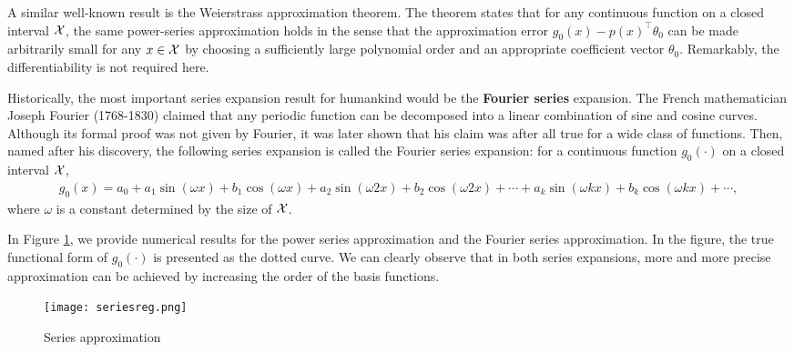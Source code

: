\documentclass[11pt, A4paper, openany, uplatex]{book}
\begin{document}
A similar well-known result is the Weierstrass approximation theorem.
The theorem states that for any continuous function on a closed interval $\mathcal{X}$, the same power-series approximation holds in the sense that the approximation error $g_0(x) - p(x)^\top \theta_0$ can be made arbitrarily small for any $x \in \mathcal{X}$ by choosing a sufficiently large polynomial order and an appropriate coefficient vector $\theta_0$. 
Remarkably, the differentiability is not required here.

Historically, the most important series expansion result for humankind would be the \textbf{Fourier series} expansion.
The French mathematician Joseph Fourier (1768-1830) claimed that any periodic function can be decomposed into a linear combination of sine and cosine curves.
Although its formal proof was not given by Fourier, it was later shown that his claim was after all true for a wide class of functions.
Then, named after his discovery, the following series expansion is called the Fourier series expansion: for a continuous function $g_0(\cdot)$ on a closed interval $\mathcal{X}$,
\begin{align*}
	g_0(x) = a_0 + a_1\sin(\omega x) + b_1\cos(\omega x) + a_2\sin(\omega 2 x) + b_2\cos(\omega 2 x) + \cdots + a_k\sin(\omega k x) + b_k\cos(\omega k x) + \cdots,
\end{align*}
where $\omega$ is a constant determined by the size of $\mathcal{X}$.

In Figure \ref{fig:seriesreg}, we provide numerical results for the power series approximation and the Fourier series approximation.
In the figure, the true functional form of $g_0(\cdot)$ is presented as the dotted curve.
We can clearly observe that in both series expansions, more and more precise approximation can be achieved by increasing the order of the basis functions.

\begin{figure}[h!]
	\begin{center}
		\texttt{[image: seriesreg.png]}
		\caption{Series approximation}\label{fig:seriesreg}
	\end{center}
\end{figure}
\end{document}
